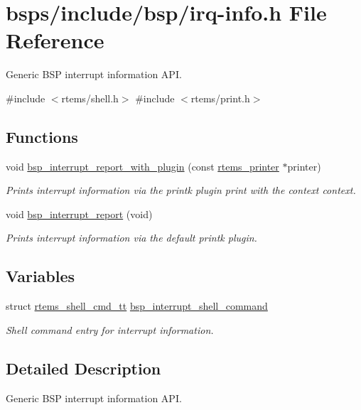 \hypertarget{irq-info_8h}{}\section{bsps/include/bsp/irq-\/info.h File Reference}
\label{irq-info_8h}


Generic B\+SP interrupt information A\+PI.  


{\ttfamily \#include $<$rtems/shell.\+h$>$}\newline
{\ttfamily \#include $<$rtems/print.\+h$>$}\newline
\subsection*{Functions}
\begin{DoxyCompactItemize}
\item 
\mbox{\label{irq-info_8h_a168f97599eb189fe05bd02878c26109b}} 
void \mbox{\hyperlink{irq-info_8h_a168f97599eb189fe05bd02878c26109b}{bsp\+\_\+interrupt\+\_\+report\+\_\+with\+\_\+plugin}} (const \mbox{\hyperlink{structrtems__printer}{rtems\+\_\+printer}} $\ast$printer)
\begin{DoxyCompactList}\small\item\em Prints interrupt information via the printk plugin {\itshape print} with the context {\itshape context}. \end{DoxyCompactList}\item 
\mbox{\label{irq-info_8h_aedadad85f99e06e3101e9da39b343985}} 
void \mbox{\hyperlink{irq-info_8h_aedadad85f99e06e3101e9da39b343985}{bsp\+\_\+interrupt\+\_\+report}} (void)
\begin{DoxyCompactList}\small\item\em Prints interrupt information via the default printk plugin. \end{DoxyCompactList}\end{DoxyCompactItemize}
\subsection*{Variables}
\begin{DoxyCompactItemize}
\item 
\mbox{\label{irq-info_8h_a6546f4911a46df70d9af2f495c2e6c79}} 
struct \mbox{\hyperlink{structrtems__shell__cmd__tt}{rtems\+\_\+shell\+\_\+cmd\+\_\+tt}} \mbox{\hyperlink{irq-info_8h_a6546f4911a46df70d9af2f495c2e6c79}{bsp\+\_\+interrupt\+\_\+shell\+\_\+command}}
\begin{DoxyCompactList}\small\item\em Shell command entry for interrupt information. \end{DoxyCompactList}\end{DoxyCompactItemize}


\subsection{Detailed Description}
Generic B\+SP interrupt information A\+PI. 

